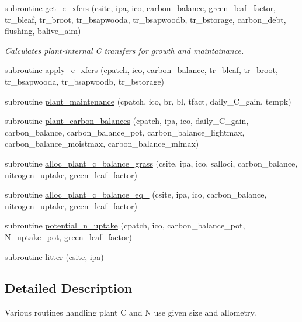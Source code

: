 \begin{DoxyCompactItemize}
subroutine \hyperlink{namespacegrowth__balive_a4a738e1e648a3932ae0beb2400c9bf78}{get\+\_\+c\+\_\+xfers} (csite, ipa, ico, carbon\+\_\+balance, green\+\_\+leaf\+\_\+factor, tr\+\_\+bleaf, tr\+\_\+broot, tr\+\_\+bsapwooda, tr\+\_\+bsapwoodb, tr\+\_\+bstorage, carbon\+\_\+debt, flushing, balive\+\_\+aim)
\begin{DoxyCompactList}\small\item\em Calculates plant-\/internal C transfers for growth and maintainance. \end{DoxyCompactList}\item 
subroutine \hyperlink{namespacegrowth__balive_a7a91aeb819248834373b9c7d9bafcbde}{apply\+\_\+c\+\_\+xfers} (cpatch, ico, carbon\+\_\+balance, tr\+\_\+bleaf, tr\+\_\+broot, tr\+\_\+bsapwooda, tr\+\_\+bsapwoodb, tr\+\_\+bstorage)
\item 
subroutine \hyperlink{namespacegrowth__balive_af977e6b599dfde9155a3ab3cb7175f16}{plant\+\_\+maintenance} (cpatch, ico, br, bl, tfact, daily\+\_\+\+C\+\_\+gain, tempk)
\item 
subroutine \hyperlink{namespacegrowth__balive_a7921154a300d0b56c862c78f641e5d3b}{plant\+\_\+carbon\+\_\+balances} (cpatch, ipa, ico, daily\+\_\+\+C\+\_\+gain, carbon\+\_\+balance, carbon\+\_\+balance\+\_\+pot, carbon\+\_\+balance\+\_\+lightmax, carbon\+\_\+balance\+\_\+moistmax, carbon\+\_\+balance\+\_\+mlmax)
\item 
subroutine \hyperlink{namespacegrowth__balive_aade95a53fd0d26aabf864afab17b1889}{alloc\+\_\+plant\+\_\+c\+\_\+balance\+\_\+grass} (csite, ipa, ico, salloci, carbon\+\_\+balance, nitrogen\+\_\+uptake, green\+\_\+leaf\+\_\+factor)
\item 
subroutine \hyperlink{namespacegrowth__balive_abc5121207b9e02b869996c48e1204381}{alloc\+\_\+plant\+\_\+c\+\_\+balance\+\_\+eq\+\_} (csite, ipa, ico, carbon\+\_\+balance, nitrogen\+\_\+uptake, green\+\_\+leaf\+\_\+factor)
\item 
subroutine \hyperlink{namespacegrowth__balive_a40618aa2149dae58efd79e039d0e51d4}{potential\+\_\+n\+\_\+uptake} (cpatch, ico, carbon\+\_\+balance\+\_\+pot, N\+\_\+uptake\+\_\+pot, green\+\_\+leaf\+\_\+factor)
\item 
subroutine \hyperlink{namespacegrowth__balive_affc86c9f292d8fa6d67dfe1d0df69337}{litter} (csite, ipa)
\end{DoxyCompactItemize}


\subsection{Detailed Description}
Various routines handling plant C and N use given size and allometry. 

